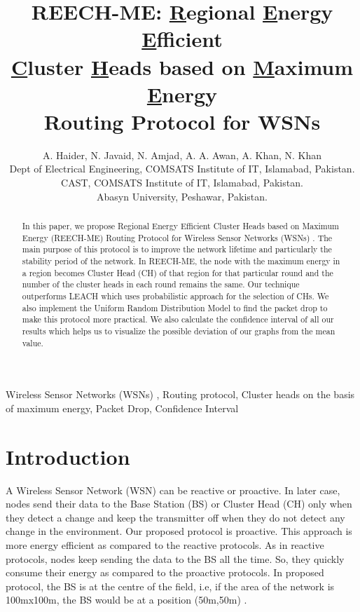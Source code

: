 \documentclass[journal]{IEEEtran}
\begin{document}
\title{REECH-ME: \underline{R}egional \underline{E}nergy \underline{E}fficient\\ \underline{C}luster \underline{H}eads based on \underline{M}aximum \underline{E}nergy\\ Routing Protocol for WSNs}

\author{A. Haider, N. Javaid, N. Amjad, A. A. Awan, A. Khan, N. Khan\\\vspace{0.4cm}
Dept of Electrical Engineering, COMSATS Institute of IT, Islamabad, Pakistan.\\
CAST, COMSATS Institute of IT, Islamabad, Pakistan.\\
Abasyn University, Peshawar, Pakistan.}
\maketitle

\begin{abstract}
\boldmath
In this paper, we propose Regional Energy Efficient Cluster Heads based on Maximum Energy (REECH-ME) Routing Protocol for Wireless Sensor Networks (WSNs) . The main purpose of this protocol is to improve the network lifetime and particularly the stability period of the network. In REECH-ME, the node with the maximum energy in a region becomes Cluster Head (CH) of that region for that particular round and the number of the cluster heads in each round remains the same. Our technique outperforms LEACH which uses probabilistic approach for the selection of CHs. We also implement the Uniform Random Distribution Model to find the packet drop to make this protocol more practical. We also calculate the confidence interval of all our results which helps us to visualize the possible deviation of our graphs from the mean value.

\end{abstract}
\begin{IEEEkeywords}
Wireless Sensor Networks (WSNs) , Routing protocol, Cluster heads on the basis of maximum energy, Packet Drop, Confidence Interval
\end{IEEEkeywords}

\section{Introduction}

A Wireless Sensor Network (WSN) can be reactive or proactive. In later case, nodes send their data to the Base Station (BS) or Cluster Head (CH) only when they detect a change and keep the transmitter off when they do not detect any change in the environment. Our proposed protocol is proactive. This approach is more energy efficient as compared to the reactive protocols. As in reactive protocols, nodes keep sending the data to the BS all the time. So, they quickly consume their energy as compared to the proactive protocols. In proposed protocol, the BS is at the centre of the field, i.e, if the area of the network is 100mx100m, the BS would be at a position (50m,50m) .
\end{document}
